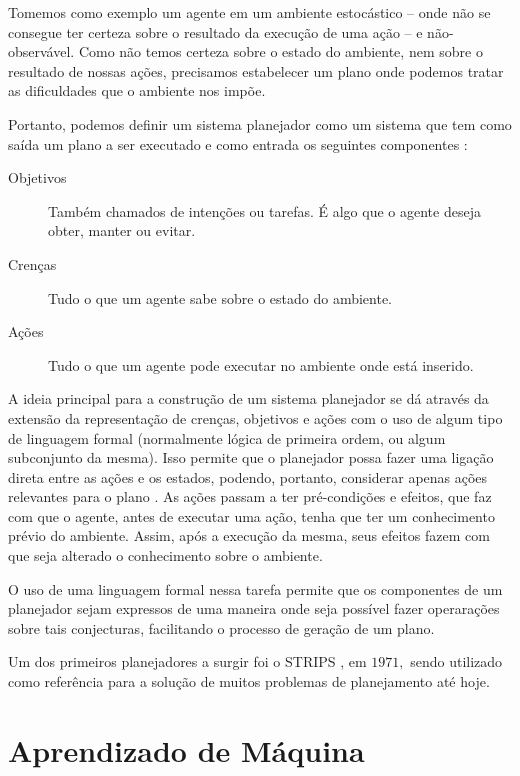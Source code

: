 Tomemos como exemplo um agente em um ambiente estocástico -- onde não se
consegue ter certeza sobre o resultado da execução de uma ação -- e
não-observável. Como não temos certeza sobre o estado do ambiente, nem sobre o
resultado de nossas ações, precisamos estabelecer um plano onde podemos tratar
as dificuldades que o ambiente nos impõe.

Portanto, podemos definir um sistema planejador como um sistema que tem como
saída um plano a ser executado e como entrada os seguintes componentes
\cite{Woolridge:2001:IMS:559667}:

\begin{description}
\item [Objetivos]
Também chamados de intenções ou tarefas. É algo que o agente deseja obter,
manter ou evitar.

\item [Crenças]
Tudo o que um agente sabe sobre o estado do ambiente.

\item [Ações]
Tudo o que um agente pode executar no ambiente onde está inserido.
\end{description}

A ideia principal para a construção de um sistema planejador se dá através da
extensão da representação de crenças, objetivos e ações com o uso de algum tipo
de linguagem formal (normalmente lógica de primeira ordem, ou algum subconjunto
da mesma). Isso permite que o planejador possa fazer uma ligação direta entre as
ações e os estados, podendo, portanto, considerar apenas ações relevantes para o
plano \cite{Russell:1995:AIM:193191}. As ações passam a ter pré-condições e
efeitos, que faz com que o agente, antes de executar uma ação, tenha que ter um
conhecimento prévio do ambiente. Assim, após a execução da mesma, seus efeitos
fazem com que seja alterado o conhecimento sobre o ambiente.

O uso de uma linguagem formal nessa tarefa permite que os componentes de um
planejador sejam expressos de uma maneira onde seja possível fazer operarações
sobre tais conjecturas, facilitando o processo de geração de um plano.

Um dos primeiros planejadores a surgir foi o STRIPS
\cite{Fikes:1971:SNA:1622876.1622939}, em $1971,$ sendo utilizado como
referência para a solução de muitos problemas de planejamento até hoje.

\section{Aprendizado de Máquina}

